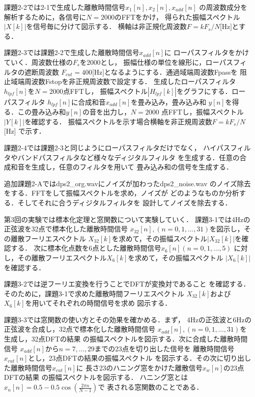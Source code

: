 \documentclass[11pt, a4paper, titlepage]{ltjsarticle}
\begin{document}
課題2-2では2-1で生成した離散時間信号$x_{1}[n],x_{2}[n],x_{add}[n]$
の周波数成分を解析するために，各信号に$N=2000$のFFTをかけ，
得られた振幅スペクトル$|X[k]|$を信号毎に分けて図示する．
横軸は非正規化周波数$F=kF_{s}/N$[Hz]とする．

課題2-3では課題2-2で生成した離散時間信号$x_{add}[n]$に
ローパスフィルタをかけていく．周波数仕様の$F_{s}$を2000とし，
振幅仕様の単位を線形に，ローパスフィルタの遮断周波数
$F_{cut}=400$[Hz]となるようにする．通過域端周波数Fpassを
阻止域端周波数Fstopを非正規周波数で設定する．
生成したローパスフィルタ$h_{lpf}[n]$を$N=2000$点FFTし，
振幅スペクトル$|H_{lpf}[k]|$をグラフにする．ローパスフィルタ
$h_{lpf}[n]$に合成和音$x_{add}[n]$を畳み込み，畳み込み和
$y[n]$を得る．この畳み込み和$y[n]$の音を出力し，$N=2000$
点FFTし，振幅スペクトル$|Y[k]|$を確認する．
振幅スペクトルを示す場合横軸を非正規周波数$F=kF_{s}/N$[Hz]
で示す．

課題2-4では課題2-3と同じようにローパスフィルタだけでなく，
ハイパスフィルタやバンドパスフィルタなど様々なディジタルフィルタ
を生成する．任意の合成和音を生成し，任意のフィルタを用いて
畳み込み和の信号を生成する．

追加課題2-Aではdps2\_org.wavにノイズが加わったdps2\_noise.wav
のノイズ除去をする．FFTをして振幅スペクトルを求め，ノイズが
どのようなものか分析する．そしてそれに合うディジタルフィルタを
設計してノイズを除去する．

第3回の実験では標本化定理と窓関数について実験していく．
課題3-1では4Hzの正弦波を32点で標本化した離散時間信号
$x_{32}[n],(n=0,1,\dots,31)$を図示し，その離散フーリエスペクトル
$X_{32}[k]$を求めて，その振幅スペクトル$|X_{32}[k]|$を確認する．
次に標本化点数を6点とした離散時間信号$x_{6}[n](n=0,1,\dots,5)$
に対し，その離散フーリエスペクトル$X_{6}[k]$を求めて，その振幅スペクトル
$|X_{6}[k]|$を確認する．

課題3-2では逆フーリエ変換を行うことでDFTが変換対であること
を確認する．そのために，課題3-1で求めた離散時間フーリエスペクトル
$X_{32}[k]$および$X_{6}[k]$を用いてそれぞれの時間信号を求め
図示する．

課題3-3では窓関数の使い方とその効果を確かめる．まず，
4Hzの正弦波と6Hzの正弦波を合成し，32点で標本化した離散時間信号
$x_{add}[n],(n=0,1,\dots,31)$を生成し，32点DFTの結果
の振幅スペクトルを図示する．次に合成した離散時間信号
$x_{add}[n]$から$n=7,\dots,29$までの23点を切り出した信号を
離散時間信号$x_{cut}[n]$とし，23点DFTの結果の振幅スペクトル
を図示する．その次に切り出した離散時間信号$x_{cut}[n]$に
長さ23のハニング窓をかけた離散信号$x_{w}[n]$の23点DFTの結果
の振幅スペクトルを図示する．
ハニング窓とは
$x_{n}[n]=0.5-0.5\cos\left(\frac{2\pi n}{N-1}\right)$で
表される窓関数のことである．
\end{document}
